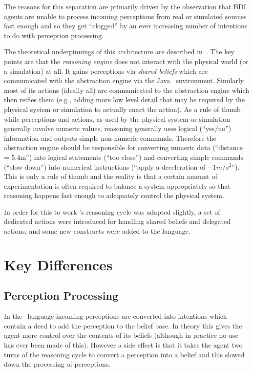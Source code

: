 The reasons for this separation are primarily driven by the observation that BDI agents are unable to process incoming perceptions from real or simulated sources fast enough and so they get ``clogged'' by an ever increasing number of intentions to do with perception processing.  

The theoretical underpinnings of this architecture are described in~\cite{DALT10:abstraction,Dennis2016}.  The key points are that the \emph{reasoning engine} does not interact with the physical world (or a simulation) at all.  It gains perceptions via \emph{shared beliefs} which are communicated with the abstraction engine via the Java \eass\ environment.  Similarly most of its actions (ideally all) are communicated to the abstraction engine which then reifies them (e.g., adding more low level detail that may be required by the physical system or simulation to actually enact the action).  As a rule of thumb while perceptions and actions, as used by the physical system or simulation generally involve numeric values, reasoning generally uses logical (``yes/no'') information and outputs simple non-numeric commands.  Therefore the abstraction engine should be responsible for converting numeric data (``distance = 5.4m'') into logical statements (``too close'') and converting simple commands (``slow down'') into numerical instructions (``apply a deceleration of $-1m/s^2$'').  This is only a rule of thumb and the reality is that a certain amount of experimentation is often required to balance a system appropriately so that reasoning happens fast enough to adequately control the physical system.

In order for this to work \gwendolen's reasoning cycle was adapted slightly, a set of dedicated actions were introduced for handling shared beliefs and delegated actions, and some new constructs were added to the language.

\section{Key Differences}
\subsection{Perception Processing}
In the \gwendolen\ language incoming perceptions are converted into intentions which contain a deed to add the perception to the belief base.  In theory this gives the agent more control over the contents of its beliefs (although in practice no use has ever been made of this).  However a side effect is that it takes the agent two turns of the reasoning cycle to convert a perception into a belief and this slowed down the processing of perceptions.

